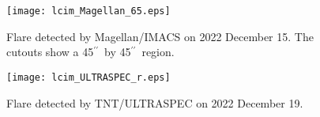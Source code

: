 \documentclass{nature_plusfigure}
\newcommand{\at}{AT2022tsd}
\newcommand{\arcsec}{$^{\prime\prime}$}
\begin{document}
\begin{figure*}
    \begin{subfigure}[t]{\textwidth}
    	\centering
    	\texttt{[image: lcim\_Magellan\_65.eps]}
	\caption{Flare detected by Magellan/IMACS on 2022 December 15. The cutouts show a 45\arcsec\ by 45\arcsec\ region.}
    \end{subfigure}
    \begin{subfigure}[t]{\textwidth}
    	\centering
   	 \texttt{[image: lcim\_ULTRASPEC\_r.eps]}
	\caption{Flare detected by TNT/ULTRASPEC on 2022 December 19.}
    \end{subfigure}
    \caption{\textbf{Luminous flares from \at\ lasting tens of minutes were clearly detected with variability timescales as short as 30\,s.} (a) Science images (``new''), images with the host galaxy subtracted (``sub''), and the corresponding light curve of a flare detected by Magellan/IMACS at the position of \at. IMACS observations consisted of five 3\,min-duration exposures. (b) Same as (a) but for a flare detected by ULTRASPEC, which is mounted on the Thai National Telescope. ULTRASPEC observations consisted of 30\,s-duration exposures with 15\,msec of dead time between exposures. Error bars are 1$\sigma$ confidence intervals.}
 \label{fig:flare-images-lc}
\end{figure*}
\end{document}
